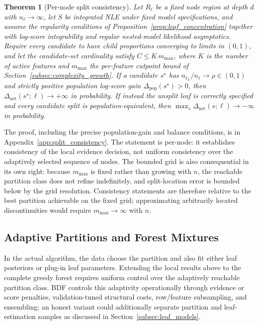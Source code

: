 \documentclass[10pt]{article} %
\newtheorem{theorem}{Theorem}
\begin{document}
\begin{theorem}[Per-node split consistency]\label{thm:split_consistency}
Let $R_\ell$ be a fixed node region at depth $d$ with $n_\ell\to\infty$, let $S$ be integrated NLE under fixed model specifications, and assume the regularity conditions of Proposition~\ref{prop:leaf_concentration} together with log-score integrability and regular nested-model likelihood asymptotics. Require every candidate to have child proportions converging to limits in $(0,1)$, and let the candidate-set cardinality satisfy $C\le K\,m_{\max}$, where $K$ is the number of active features and $m_{\max}$ the per-feature cutpoint bound of Section~\ref{subsec:complexity_growth}. If a candidate $s^\star$ has $n_{\ell_L}/n_\ell\to\rho\in(0,1)$ and strictly positive population log-score gain $\Delta_{\mathrm{pop}}(s^\star)>0$, then $\Delta_{\mathrm{net}}(s^\star;\ell)\to+\infty$ in probability. If instead the unsplit leaf is correctly specified and every candidate split is population-equivalent, then $\max_s\Delta_{\mathrm{net}}(s;\ell)\to-\infty$ in probability.
\end{theorem}

The proof, including the precise population-gain and balance conditions, is in Appendix~\ref{app:split_consistency}. The statement is per-node: it establishes consistency of the local evidence decision, not uniform consistency over the adaptively selected sequence of nodes. The bounded grid is also consequential in its own right: because $m_{\max}$ is fixed rather than growing with $n$, the reachable partition class does not refine indefinitely, and split-location error is bounded below by the grid resolution. Consistency statements are therefore relative to the best partition achievable on the fixed grid; approximating arbitrarily located discontinuities would require $m_{\max}\to\infty$ with $n$.

\subsection{Adaptive Partitions and Forest Mixtures}
\label{subsec:theory_adaptive_caveat}
\label{subsec:theory_forest}

In the actual algorithm, the data choose the partition and also fit either leaf posteriors or plug-in leaf parameters. Extending the local results above to the complete greedy forest requires uniform control over the adaptively reachable partition class. BDF controls this adaptivity operationally through evidence or score penalties, validation-tuned structural costs, row/feature subsampling, and ensembling; an honest variant could additionally separate partition and leaf-estimation samples as discussed in Section~\ref{subsec:leaf_models}.
\end{document}
